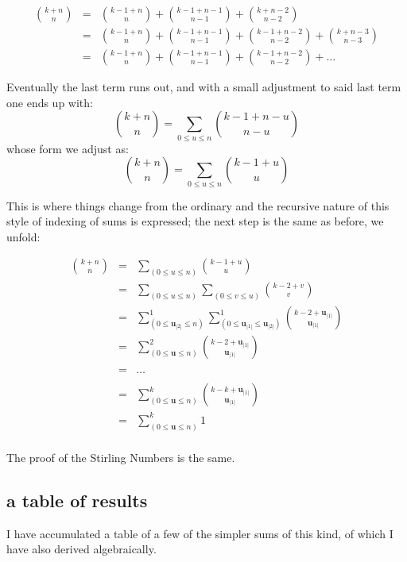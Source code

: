 \documentclass[twoside]{amsart}
\newcommand{\bu}[1][u]{\ensuremath{\mathbf #1}}
\begin{document}
\begin{eqnarray*}
{k+n\choose n} & = & {k-1+n\choose n}+{k-1+n-1\choose n-1}+{k+n-2\choose n-2} \\
 & = & {k-1+n\choose n}+{k-1+n-1\choose n-1}+{k-1+n-2\choose n-2}+{k+n-3\choose n-3} \\
 & = & {k-1+n\choose n}+{k-1+n-1\choose n-1}+{k-1+n-2\choose n-2}+\ldots
\end{eqnarray*}

Eventually the last term runs out, and with a small adjustment to said last term one ends up with:
$$ {k+n\choose n}=\sum_{0\le u\le n}{k-1+n-u\choose n-u} $$
whose form we adjust as:
$$ {k+n\choose n}=\sum_{0\le u\le n}{k-1+u\choose u} $$

This is where things change from the ordinary and the recursive nature of this style of indexing of sums is expressed;
the next step is the same as before, we unfold:

\begin{eqnarray*}
{k+n\choose n} & = & \sum_{(0\le u\le n)}{k-1+u\choose u} \\
 & = & \sum_{(0\le u\le n)}\sum_{(0\le v\le u)}{k-2+v\choose v} \\
 & = & \sum_{(0\le\bu_{|2|}\le n)}^1\sum_{(0\le\bu_{|1|}\le\bu_{|2|})}^1{k-2+\bu_{|1|}\choose \bu_{|1|}} \\
 & = & \sum_{(0\le\bu\le n)}^2{k-2+\bu_{|1|}\choose \bu_{|1|}} \\
 &   & \\
 & = & \ldots \\
 &   & \\
 & = & \sum_{(0\le\bu\le n)}^k{k-k+\bu_{|1|}\choose \bu_{|1|}} \\
 & = & \sum_{(0\le\bu\le n)}^k 1 \\
\end{eqnarray*}

The proof of the Stirling Numbers is the same.

\subsection{a table of results}

I have accumulated a table of a few of the simpler sums of this kind, of which I have also derived
algebraically.

\end{document}
